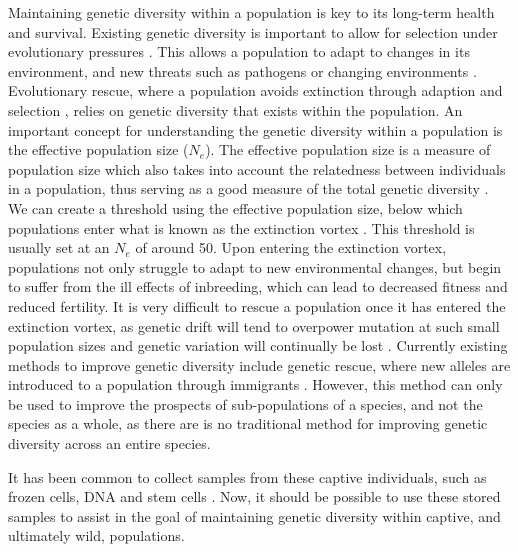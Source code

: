 \documentclass[12pt]{article}
\begin{document}
	Maintaining genetic diversity within a population is key to its long-term health and
	survival. Existing genetic diversity is important to allow for selection under
	evolutionary pressures \citep{harmonConservationSmallPopulations2010}. This allows a population to adapt to changes in its environment,
	and new threats such as pathogens or changing environments
	\citep{mccallumTasmanianDevilFacial2008}. Evolutionary rescue, where a population
	avoids extinction through adaption and selection
	\citep{bellEvolutionaryRescue2017}, relies on genetic diversity that
	exists within the population.
	An important concept for understanding the genetic diversity within a population is the
	effective population size ($N_e$). The effective population size is a measure of
	population size which also takes into account the relatedness between individuals in
	a population, thus serving as a good measure of the total genetic diversity
	\citep{frankhamEffectivePopulationSize1995}. We can
	create a threshold using the effective population size, below which populations enter
	what is known as the extinction vortex \citep{harmonConservationSmallPopulations2010}. This threshold is usually set at an $N_e$ of
	around 50. Upon entering the extinction vortex, populations not only struggle to
	adapt to new environmental changes, but begin to suffer from the ill effects of
	inbreeding, which can lead to decreased fitness and reduced fertility. It is very
	difficult to rescue a population once it has entered the extinction vortex, as genetic
	drift will tend to overpower mutation at such small population sizes and genetic
	variation will continually be lost \citep{harmonConservationSmallPopulations2010}.
	Currently existing methods to improve genetic diversity include genetic rescue,
	where new alleles are introduced to a population through immigrants
	\citep{whiteleyGeneticRescueRescue2015}. However, this method can only be used to
	improve the prospects of sub-populations of a species, and not the species as a
	whole, as there are is no traditional method for improving genetic diversity
	across an entire species.
	
	
	It has been common to collect samples
	from these captive individuals, such as frozen cells, DNA and stem cells \citep{angelesChallengesDevelopmentBiodiversity2022, breithoffArkBankExtinction2020}. Now, it
	should be possible to use these stored samples to assist in the goal of maintaining
	genetic diversity within captive, and ultimately wild, populations.
	
\end{document}
